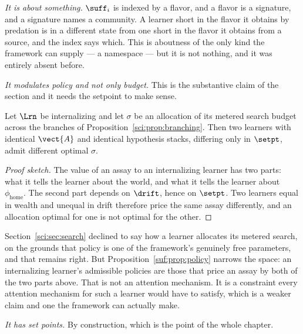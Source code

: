 \emph{It is about something.}
$\suff_i$ is indexed by a flavor, and a flavor is a signature, and a
signature names a community.
A learner short in the flavor it obtains by predation is in a different
state from one short in the flavor it obtains from a source, and the
index says which.
This is aboutness of the only kind the framework can supply --- a
namespace --- but it is not nothing, and it was entirely absent before.

\emph{It modulates policy and not only budget.}
This is the substantive claim of the section and it needs the setpoint to
make sense.

\begin{proposition}
\label{suf:prop:policy}
Let $\Lrn$ be internalizing and let $\sigma$ be an allocation of its
metered search budget across the branches of
Proposition~\ref{sci:prop:branching}.
Then two learners with identical $\vect{A}$ and identical hypothesis
stacks, differing only in $\setpt$, admit different optimal $\sigma$.
\end{proposition}

\begin{proof}[Proof sketch]
The value of an assay to an internalizing learner has two parts: what it
tells the learner about the world, and what it tells the learner about
$\phi_{\mathrm{home}}$.
The second part depends on $\drift$, hence on $\setpt$.
Two learners equal in wealth and unequal in drift therefore price the
same assay differently, and an allocation optimal for one is not optimal
for the other.
\end{proof}

\begin{remark}
\label{suf:rem:attention}
Section~\ref{sci:sec:search} declined to say how a learner allocates its
metered search, on the grounds that policy is one of the framework's
genuinely free parameters, and that remains right.
But Proposition~\ref{suf:prop:policy} narrows the space: an internalizing
learner's admissible policies are those that price an assay by both of
the two parts above.
That is not an attention mechanism.
It is a constraint every attention mechanism for such a learner would
have to satisfy, which is a weaker claim and one the framework can
actually make.
\end{remark}

\emph{It has set points.}
By construction, which is the point of the whole chapter.

